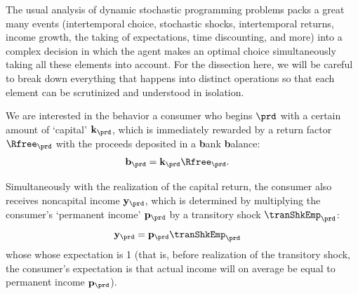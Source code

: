 \documentclass[titlepage, headings=optiontotocandhead]{econtex}
\begin{document}
The usual analysis of dynamic stochastic programming problems packs a great many events (intertemporal choice, stochastic shocks, intertemporal returns, income growth, the taking of expectations, time discounting, and more) into a complex decision in which the agent makes an optimal choice simultaneously taking all these elements into account. For the dissection here, we will be careful to break down everything that happens into distinct operations so that each element can be scrutinized and understood in isolation.

We are interested in the behavior a consumer who begins {\interval} $\prd$ with a certain amount of `capital' $\mathbf{k}_{\prd}$, which is immediately rewarded by a return factor $\Rfree_{\prd}$  with the proceeds deposited in a \textbf{b}ank \textbf{b}alance:
\begin{equation}\begin{gathered}\begin{aligned}\label{eq:bLvl}
      \mathbf{b}_{\prd} & = \mathbf{k}_{\prd}\Rfree_{\prd}. 
    \end{aligned}\end{gathered}\end{equation}

Simultaneously with the realization of the capital return, the consumer also receives noncapital income $\mathbf{y}_{\prd}$, which is determined by multiplying the consumer's `permanent income' $\mathbf{p}_{\prd}$ by a transitory shock $\tranShkEmp_{\prd}$:
\begin{equation}\begin{gathered}\begin{aligned}
      \mathbf{y}_{\prd} & = \mathbf{p}_{\prd}\tranShkEmp_{\prd} \label{eq:yLvl}
    \end{aligned}\end{gathered}\end{equation}
whose whose expectation is 1 (that is, before realization of the transitory shock, the consumer's expectation is that actual income will on average be equal to permanent income $\mathbf{p}_{\prd}$).
\end{document}
